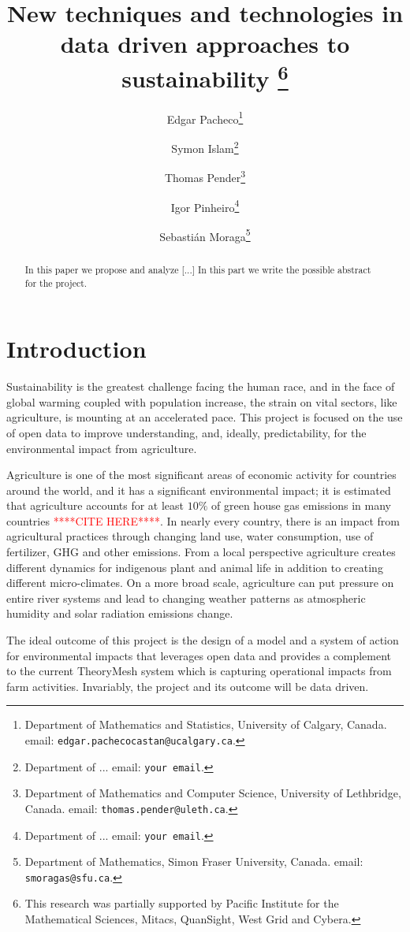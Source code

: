 \documentclass[11pt]{article}
\title{New techniques and technologies in data driven approaches to sustainability
\thanks{This research was 
partially supported by  Pacific Institute for the Mathematical Sciences, Mitacs, QuanSight, West Grid and Cybera.}}
\author{{\sc Edgar Pacheco}\thanks{Department of Mathematics and Statistics, University of Calgary, Canada.
email: {\tt edgar.pachecocastan@ucalgary.ca}.}
\and
{\sc Symon Islam}\thanks{Department of ...
email: {\tt your email}.}
\and
{\sc Thomas Pender}\thanks{Department of Mathematics and Computer Science, University of Lethbridge, Canada.
email: {\tt thomas.pender@uleth.ca}.}
\and
{\sc Igor Pinheiro}\thanks{Department of ...
email: {\tt your email}.}
\and
{\sc Sebasti\'an Moraga}\thanks{ Department of Mathematics, Simon Fraser University, Canada.
email: {\tt smoragas@sfu.ca}.}}
\date{}
\numberwithin{equation}{section}
\newcommand{\rred}[1]{\textcolor{red}{#1}}
\newcommand{\ccite}{\rred{****CITE HERE****}}
\begin{document}
\maketitle

\begin{abstract}
\noindent
In this paper we propose and analyze [...] In this part we write the possible abstract for the project.

\end{abstract}

\smallskip\noindent

                                                  

\section{Introduction}\label{introduction}

Sustainability is the greatest challenge facing the human race, and in the face of global warming coupled with population increase, the strain on vital sectors, like agriculture, is mounting at an accelerated pace. This project is focused on the use of open data to improve understanding, and, ideally, predictability, for the environmental impact from agriculture. 

Agriculture is one of the most significant areas of economic activity for countries around the world, and it has a significant environmental impact; it is estimated that agriculture accounts for at least $10\%$ of green house gas emissions in many countries \ccite. In nearly every country, there is an impact from agricultural practices through changing land use, water consumption, use of fertilizer, GHG and other emissions. From a local perspective agriculture creates different dynamics for indigenous plant and animal life in addition to creating different micro-climates. On a more broad scale, agriculture can put pressure on entire river systems and lead to changing weather patterns as atmospheric humidity and solar radiation emissions change.

The ideal outcome of this project is the design of a model and a system of action for environmental impacts that leverages open data and provides a complement to the current TheoryMesh system which is capturing operational impacts from farm activities. Invariably, the project and its outcome will be data driven.
\end{document}
